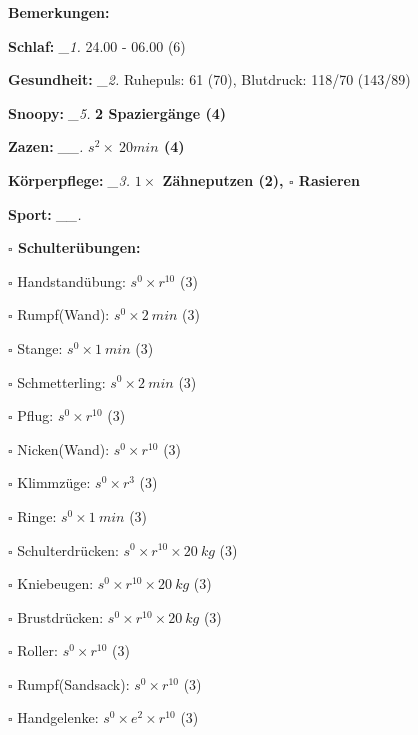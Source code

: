 \documentclass[10pt,a4paper]{article}
\newcommand\prop[1] {{\color {alizarin} {\bf #1}}}             %
\newcommand\draf[1] {{\color {amber(sae/ece)} {\bf #1}}}       %
\newcommand\mand[1] {{\color {burntorange} {\bf #1}}}          %
\newcommand\topspace{\vskip -15pt \hskip 20pt}
\newcommand\n[1] { {\sl #1.} \hskip 5pt }
\begin{document}
\begin{mdframed}[style=daystyle]
  \begin{labeling}{{\mand {Bemerkungen:}}}
    \setlength\itemsep{-3pt}
  \item[{\mand {Schlaf:}}]        \n{\_1} 24.00 - 06.00 (6)
  \item[{\mand {Gesundheit:}}]    \n{\_2} Ruhepuls: 61 (70), Blutdruck: 118/70 (143/89)
  \item[{\mand {Snoopy:}}]        \n{\_5} {\draf {2 Spaziergänge (4)}}    
  \item[{\mand {Zazen:}}]        \n{\_\_} {\draf {$s^2 \times\ 20 min$ (4)}}
  \item[{\mand {Körperpflege:}}]  \n{\_3} {\draf {$1 \times$ Zähneputzen (2), $\square$ Rasieren}}
  \item[{\mand {Sport:}}]        \n{\_\_}
    \topspace
    \begin{minipage}{0.75\textwidth}  
      \begin{labeling}{\prop {$\square$ {Schulterübungen:}}} 
        \setlength\itemsep{-3pt}
      \item[$\square$ Handstandübung:]  $s^0 \times r^{10}$ (3)
      \item[$\square$ Rumpf(Wand):]     $s^0 \times 2\ min$ (3)
      \item[$\square$ Stange:]          $s^0 \times 1\ min$ (3)
      \item[$\square$ Schmetterling:]   $s^0 \times 2\ min$ (3)
      \item[$\square$ Pflug:]           $s^0 \times r^{10}$ (3)
      \item[$\square$ Nicken(Wand):]    $s^0 \times r^{10}$ (3)
      \item[$\square$ Klimmzüge:]       $s^0 \times r^3$ (3)
      \item[$\square$ Ringe:]           $s^0 \times 1\ min$ (3)
      \item[$\square$ Schulterdrücken:] $s^0 \times r^{10} \times 20\ kg$ (3)
      \item[$\square$ Kniebeugen:]      $s^0 \times r^{10} \times 20\ kg$ (3)
      \item[$\square$ Brustdrücken:]    $s^0 \times r^{10} \times 20\ kg$ (3)
      \item[$\square$ Roller:]          $s^0 \times r^{10}$ (3)
      \item[$\square$ Rumpf(Sandsack):] $s^0 \times r^{10}$ (3)
      \item[$\square$ Handgelenke:]     $s^0 \times e^2 \times r^{10}$ (3)

\end{labeling}
\end{minipage}
\end{labeling}
\end{mdframed}
\end{document}
